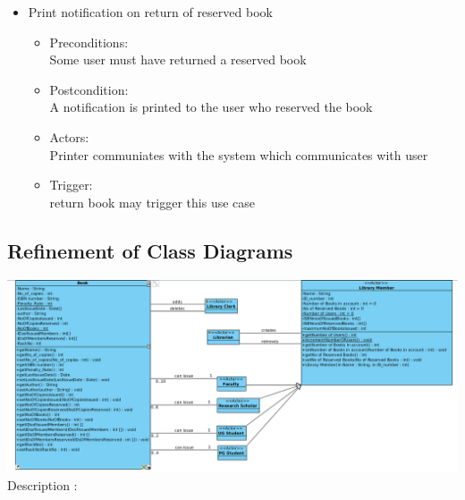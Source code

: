 \documentclass[a4paper]{article}
\begin{document}
\begin{enumerate}
\begin{itemize}
\item Print notification on return of reserved book\\ 
\begin{itemize}
\item Preconditions:\\ Some user must have returned a reserved book \\ 
 \item Postcondition:\\ A notification is printed to the user who reserved the book\\ 
 \item Actors: \\ Printer communiates with the system which communicates with user\\ 
 \item Trigger:\\ return book may trigger this use case\\ 
\end{itemize}

\end{itemize}
\end{enumerate}
\subsection{Refinement of Class Diagrams}
\includegraphics[scale=0.35]{images/classDiag.png}
\\
Description : \\
\end{document}
